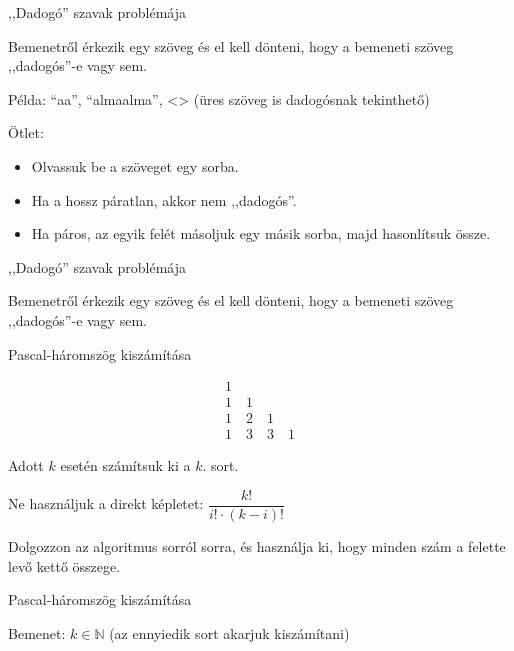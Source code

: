 \documentclass[hungarian]{beamer}
\begin{document}
\begin{frame}{,,Dadogó'' szavak problémája}

Bemenetről érkezik egy szöveg és el kell dönteni, hogy a bemeneti szöveg ,,dadogós''-e vagy sem.

Példa: ``aa'', ``almaalma'', <> (üres szöveg is dadogósnak tekinthető)

Ötlet:

\begin{itemize}
    \item Olvassuk be a szöveget egy sorba.
    \item Ha a hossz páratlan, akkor nem ,,dadogós''.
    \item Ha páros, az egyik felét másoljuk egy másik sorba, majd hasonlítsuk össze.
\end{itemize}

\end{frame}

\begin{frame}[t]{,,Dadogó'' szavak problémája}

Bemenetről érkezik egy szöveg és el kell dönteni, hogy a bemeneti szöveg ,,dadogós''-e vagy sem.

\end{frame}

\begin{frame}[t]{Pascal-háromszög kiszámítása}

\[
\begin{array}{c}
       1 \\
     1 \quad 1 \\
   1 \quad 2 \quad 1 \\
 1 \quad 3 \quad 3 \quad 1
\end{array}
\]

Adott $k$ esetén számítsuk ki a $k$. sort.

Ne használjuk a direkt képletet: $\dfrac{k!}{i!\cdot(k-i)!}$

Dolgozzon az algoritmus sorról sorra, és használja ki, hogy minden szám a felette levő kettő összege.

\end{frame}

\begin{frame}[t]{Pascal-háromszög kiszámítása}

Bemenet: $k \in \mathbb{N}$ (az ennyiedik sort akarjuk kiszámítani)

\end{frame}

\fi
\end{document}
